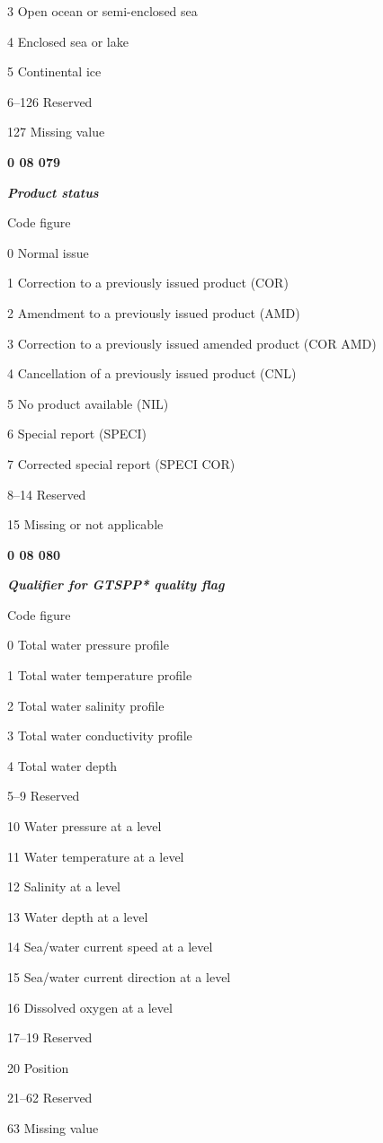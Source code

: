 3 Open ocean or semi-enclosed sea

4 Enclosed sea or lake

5 Continental ice

6--126 Reserved

127 Missing value

\textbf{0 08 079}

\emph{\textbf{Product status}}

Code figure

0 Normal issue

1 Correction to a previously issued product (COR)

2 Amendment to a previously issued product (AMD)

3 Correction to a previously issued amended product (COR AMD)

4 Cancellation of a previously issued product (CNL)

5 No product available (NIL)

6 Special report (SPECI)

7 Corrected special report (SPECI COR)

8--14 Reserved

15 Missing or not applicable

\textbf{0 08 080}

\emph{\textbf{Qualifier for GTSPP* quality flag}}

Code figure

0 Total water pressure profile

1 Total water temperature profile

2 Total water salinity profile

3 Total water conductivity profile

4 Total water depth

5--9 Reserved

10 Water pressure at a level

11 Water temperature at a level

12 Salinity at a level

13 Water depth at a level

14 Sea/water current speed at a level

15 Sea/water current direction at a level

16 Dissolved oxygen at a level

17--19 Reserved

20 Position

21--62 Reserved

63 Missing value

